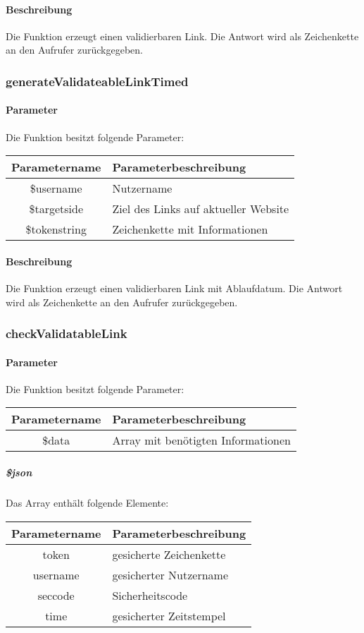 \paragraph{Beschreibung} Die Funktion erzeugt einen validierbaren Link. Die Antwort wird als Zeichenkette an den Aufrufer zurückgegeben.
\subsubsection{generateValidateableLinkTimed}
\paragraph{Parameter} Die Funktion besitzt folgende Parameter:
\begin{table}[H]
	\begin{tabular}{|c|p{11cm}|}
		\hline
		\textbf{Parametername} & \textbf{Parameterbeschreibung} \\ \hline
		\$username    & Nutzername \\ \hline
		\$targetside  & Ziel des Links auf aktueller Website \\ \hline
		\$tokenstring & Zeichenkette mit Informationen \\ \hline
	\end{tabular}
\end{table}
\paragraph{Beschreibung} Die Funktion erzeugt einen validierbaren Link mit Ablaufdatum. Die Antwort wird als Zeichenkette an den Aufrufer zurückgegeben.
\subsubsection{checkValidatableLink}
\paragraph{Parameter} Die Funktion besitzt folgende Parameter:
\begin{table}[H]
	\begin{tabular}{|c|p{11cm}|}
		\hline
		\textbf{Parametername} & \textbf{Parameterbeschreibung} \\ \hline
		\$data & Array mit benötigten Informationen \\ \hline
	\end{tabular}
\end{table}
\subparagraph{\$json}Das Array enthält folgende Elemente:
\begin{table}[H]
	\begin{tabular}{|c|p{11cm}|}
		\hline
		\textbf{Parametername} & \textbf{Parameterbeschreibung} \\ \hline
		token    & gesicherte Zeichenkette \\ \hline
		username & gesicherter Nutzername \\ \hline
		seccode  & Sicherheitscode \\ \hline
		time     & gesicherter Zeitstempel \\ \hline
	\end{tabular}
\end{table}
